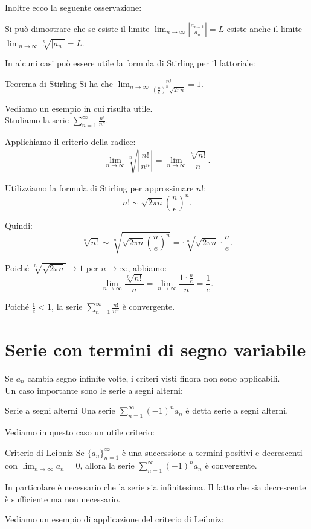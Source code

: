 Inoltre ecco la seguente osservazione:
\begin{osservazione}{}
  Si può dimostrare che se esiste il limite $\lim_{n \to \infty} \left| \frac{a_{n+1}}{a_n} \right| = L$ esiste anche il limite $\lim_{n \to \infty} \sqrt[n]{|a_n|} = L$.
\end{osservazione}

In alcuni casi può essere utile la formula di Stirling per il fattoriale:
\begin{teorema}{Teorema di Stirling}
  Si ha che $\lim_{n \to \infty} \frac{n!}{(\frac{n}{e})^n \sqrt{2\pi n}} = 1$.
\end{teorema}
Vediamo un esempio in cui risulta utile.\\
Studiamo la serie $\sum_{n=1}^{\infty} \frac{n!}{n^n}$.

Applichiamo il criterio della radice:
\[
\lim_{n \to \infty} \sqrt[n]{\left| \frac{n!}{n^n} \right|} = \lim_{n \to \infty} \frac{\sqrt[n]{n!}}{n}.
\]

Utilizziamo la formula di Stirling per approssimare $n!$:
\[
n! \sim \sqrt{2\pi n} \left( \frac{n}{e} \right)^n.
\]

Quindi:
\[
\sqrt[n]{n!} \sim \sqrt[n]{ \sqrt{2\pi n} \left( \frac{n}{e} \right)^n} = \cdot \sqrt[n]{\sqrt{2\pi n}} \cdot \frac{n}{e}.
\]

Poiché $\sqrt[n]{\sqrt{2\pi n}} \to 1$ per $n \to \infty$, abbiamo:
\[
\lim_{n \to \infty} \frac{\sqrt[n]{n!}}{n} = \lim_{n \to \infty} \frac{ 1 \cdot \frac{n}{e}}{n} = \frac{1}{e}.
\]

Poiché $\frac{1}{e} < 1$, la serie $\sum_{n=1}^{\infty} \frac{n!}{n^n}$ è convergente.

\section{Serie con termini di segno variabile}
Se $a_n$ cambia segno infinite volte, i criteri visti finora non sono applicabili.\\
Un caso importante sono le serie a segni alterni:
\begin{definizione}{Serie a segni alterni}
  Una serie $\sum_{n=1}^{\infty} (-1)^n a_n$ è detta serie a segni alterni.
\end{definizione}
Vediamo in questo caso un utile criterio:
\begin{teorema}{Criterio di Leibniz}
  Se $\{a_n\}_{n=1}^{\infty}$ è una successione a termini positivi e decrescenti con $\lim_{n \to \infty} a_n = 0$, allora la serie $\sum_{n=1}^{\infty} (-1)^n a_n$ è convergente.
\end{teorema}
\begin{osservazione}{}
  In particolare è necessario che la serie sia infinitesima. Il fatto che sia decrescente è sufficiente ma non necessario.
\end{osservazione}
Vediamo un esempio di applicazione del criterio di Leibniz:\\

